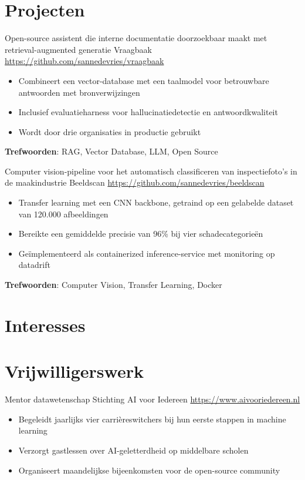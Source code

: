 \documentclass[a4paper, serif, 10pt]{moderncv}
\begin{document}
\section{Projecten}

        {Open-source assistent die interne documentatie doorzoekbaar maakt met retrieval-augmented generatie}
        {Vraagbaak}
        {\url{https://github.com/sannedevries/vraagbaak}}
        {}
        {\begin{itemize}
\item Combineert een vector-database met een taalmodel voor betrouwbare antwoorden met bronverwijzingen
\item Inclusief evaluatieharness voor hallucinatiedetectie en antwoordkwaliteit
\item Wordt door drie organisaties in productie gebruikt
\end{itemize}
\textbf{Trefwoorden}: RAG, Vector Database, LLM, Open Source}

        {Computer vision-pipeline voor het automatisch classificeren van inspectiefoto's in de maakindustrie}
        {Beeldscan}
        {\url{https://github.com/sannedevries/beeldscan}}
        {}
        {\begin{itemize}
\item Transfer learning met een CNN backbone, getraind op een gelabelde dataset van 120.000 afbeeldingen
\item Bereikte een gemiddelde precisie van 96\% bij vier schadecategorieën
\item Geïmplementeerd als containerized inference-service met monitoring op datadrift
\end{itemize}
\textbf{Trefwoorden}: Computer Vision, Transfer Learning, Docker}
\section{Interesses}

\section{Vrijwilligerswerk}

        {Mentor datawetenschap}
        {Stichting AI voor Iedereen}
        {\url{https://www.aivooriedereen.nl}}
        {}
        {\begin{itemize}
\item Begeleidt jaarlijks vier carrièreswitchers bij hun eerste stappen in machine learning
\item Verzorgt gastlessen over AI-geletterdheid op middelbare scholen
\item Organiseert maandelijkse bijeenkomsten voor de open-source community
\end{itemize}}
    
\end{document}
